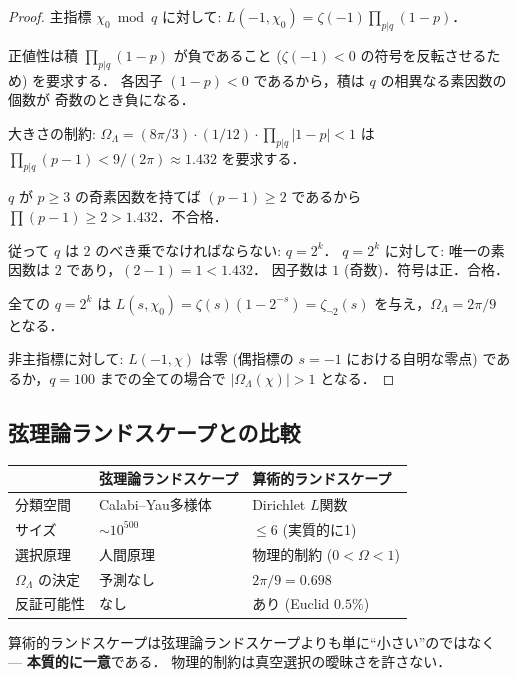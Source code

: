 \documentclass[11pt,a4paper]{article}
\begin{document}
\begin{proof}
主指標 $\chi_0 \bmod q$ に対して:
$L(-1, \chi_0) = \zeta(-1)\prod_{p|q}(1-p)$．

正値性は積 $\prod_{p|q}(1-p)$ が負であること
($\zeta(-1) < 0$ の符号を反転させるため) を要求する．
各因子 $(1-p) < 0$ であるから，積は $q$ の相異なる素因数の個数が
奇数のとき負になる．

大きさの制約:
$\Omega_\Lambda = (8\pi/3) \cdot (1/12) \cdot \prod_{p|q}|1-p| < 1$
は $\prod_{p|q}(p-1) < 9/(2\pi) \approx 1.432$ を要求する．

$q$ が $p \geq 3$ の奇素因数を持てば
$(p-1) \geq 2$ であるから $\prod(p-1) \geq 2 > 1.432$．不合格．

従って $q$ は $2$ のべき乗でなければならない: $q = 2^k$．
$q = 2^k$ に対して: 唯一の素因数は $2$ であり，$(2-1) = 1 < 1.432$．
因子数は $1$ (奇数)．符号は正．合格．

全ての $q = 2^k$ は $L(s, \chi_0) = \zeta(s)(1-2^{-s}) =
\zeta_{\neg 2}(s)$ を与え，$\Omega_\Lambda = 2\pi/9$ となる．

非主指標に対して: $L(-1, \chi)$ は零 (偶指標の $s = -1$ における自明な零点)
であるか，$q = 100$ までの全ての場合で $|\Omega_\Lambda(\chi)| > 1$ となる．
\end{proof}

\subsection{弦理論ランドスケープとの比較}

\begin{center}
\begin{tabular}{lll}
\toprule
& 弦理論ランドスケープ & 算術的ランドスケープ \\
\midrule
分類空間 & Calabi--Yau多様体 & Dirichlet $L$関数 \\
サイズ & $\sim 10^{500}$ & $\leq 6$ (実質的に1) \\
選択原理 & 人間原理 & 物理的制約 ($0 < \Omega < 1$) \\
$\Omega_\Lambda$ の決定 & 予測なし & $2\pi/9 = 0.698$ \\
反証可能性 & なし & あり (Euclid $0.5\%$) \\
\bottomrule
\end{tabular}
\end{center}

算術的ランドスケープは弦理論ランドスケープよりも単に``小さい''のではなく
--- \textbf{本質的に一意}である．
物理的制約は真空選択の曖昧さを許さない．
\end{document}
